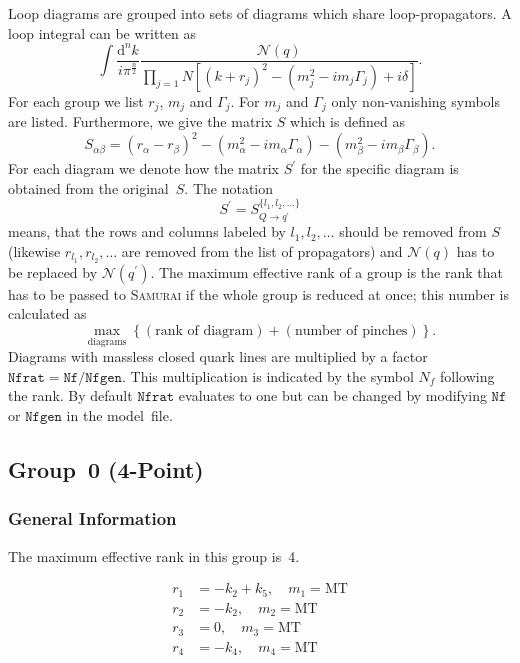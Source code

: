 \documentclass[a4paper]{article}
\begin{document}
Loop diagrams are grouped into sets of diagrams which share
loop-propagators. A loop integral can be written as
\begin{equation}
\int\!\frac{\mathrm{d}^nk}{i\pi^{\frac{n}{2}}}%
\frac{\mathcal{N}(q)}{\prod_{j=1}{N}\left[(k+r_j)^2-(m_j^2
   -i m_j\Gamma_j) + i\delta\right]}.
\end{equation}
For each group we list $r_j$, $m_j$ and $\Gamma_j$.
For $m_j$ and $\Gamma_j$ only non-vanishing symbols are listed.
Furthermore, we give the matrix $S$ which is defined as
\begin{equation}
S_{\alpha\beta} = (r_\alpha-r_\beta)^2
-(m_\alpha^2-im_\alpha\Gamma_\alpha)
-(m_\beta^2-im_\beta\Gamma_\beta).
\end{equation}
For each diagram we denote how the matrix $S^\prime$ for the specific diagram
is obtained from the original~$S$. The notation
\begin{equation}
S^\prime=S_{Q\to q^\prime}^{\{l_1,l_2,\ldots\}}
\end{equation}
means, that the rows and columns labeled by $l_1,l_2,\ldots$ should be
removed from $S$ (likewise $r_{l_1}, r_{l_2}, \ldots$ are removed from the
list of propagators) and $\mathcal{N}(q)$ has to be replaced by
$\mathcal{N}(q^\prime)$.
The maximum effective rank of a group is the rank that has to be passed
to \textsc{Samurai} if the whole group is reduced at once; this number
is calculated as
\begin{equation}
\max_{\text{diagrams}}\left\{(\text{rank of diagram})+
(\text{number of pinches})\right\}.
\end{equation}
Diagrams with massless closed quark lines are multiplied by a factor
$\mathtt{Nfrat}=\mathtt{Nf}/\mathtt{Nfgen}$. This multiplication is indicated
by the symbol $N_f$ following the rank. By default $\mathtt{Nfrat}$ evaluates
to one but can be changed by modifying $\mathtt{Nf}$ or $\mathtt{Nfgen}$ in the
model~file.


\subsection{Group~0 (4-Point)}
\subsubsection*{General Information}
The maximum effective rank in this group is~4.

\begin{subequations}
\begin{align}
r_{1} &= -k_{2}+k_{5},\quad m_{1} = \text{MT}\\
r_{2} &= -k_{2},\quad m_{2} = \text{MT}\\
r_{3} &= 0,\quad m_{3} = \text{MT}\\
r_{4} &= -k_{4},\quad m_{4} = \text{MT}
\end{align}
\end{subequations}
\end{document}
